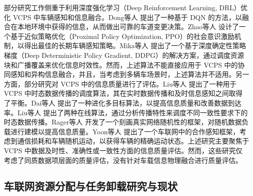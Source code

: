 部分研究工作侧重于利用深度强化学习（Deep Reinforcement Learning, DRL）优化 VCPS 中车辆感知和信息融合。Dong等人 \cite{dong2020spatio} 提出了一种基于 DQN 的方法，以融合在本地环境中获得的信息，从而做出可靠的车道变更决策。Zhao等人 \cite{zhao2020social} 设计了一个基于近似策略优化（Proximal Policy Optimization, PPO）的社会意识激励机制，以得出最佳的长期车辆感知策略。Mika等人 \cite{mlika2022deep} 提出了一个基于深度确定性策略梯度（Deep Deterministic Policy Gradient, DDPG）的解决方案，通过调度资源块和广播覆盖来优化信息时效性。然而，上述算法不能直接应用于 VCPS 中的协同感知和异构信息融合，并且，当考虑到多辆车场景时，上述算法并不适用。另一方面，部分研究对 VCPS 中的信息质量进行了评估。Liu等人 \cite{liu2014temporal} 提出了一种用于 VCPS 中时态数据传播的调度算法，其在实时数据传播和及时信息感知之间取得了平衡。Dai等人 \cite{dai2019temporal} 提出了一种进化多目标算法，以提高信息质量和改善数据到达率。Liu等人 \cite{liu2014scheduling} 提出了两种在线算法，通过分析传播特性来调度不同一致性要求下的时态数据传播。Rager等人 \cite{rager2017scalability} 开发了一个刻画真实网络随机性的框架，对随机数据负载进行建模以提高信息质量。Yoon等人 \cite{yoon2021performance} 提出了一个车联网中的合作感知框架，考虑到通信损耗和车辆随机运动，以获得车辆的精确运动状态。上述研究主要聚焦于 VCPS 中数据及时性、准确性或一致性方面的信息质量评估。然而，这些研究仅考虑了同质数据项层面的质量评估，没有针对车载信息物理融合进行质量评估。

\subsection{车联网资源分配与任务卸载研究与现状}

